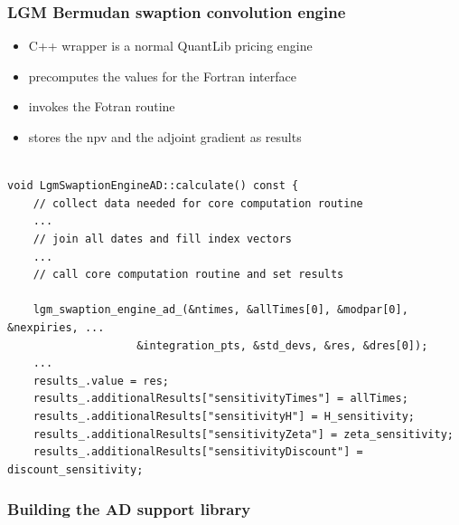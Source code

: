 \documentclass{beamer}
\begin{document}
\begin{frame}[fragile]
\frametitle{LGM Bermudan swaption convolution engine}
\begin{itemize}
\item C++ wrapper is a normal QuantLib pricing engine
\item precomputes the values for the Fortran interface
\item invokes the Fotran routine
\item stores the npv and the adjoint gradient as results
\end{itemize}
\begin{verbatim}

void LgmSwaptionEngineAD::calculate() const {
    // collect data needed for core computation routine
    ...
    // join all dates and fill index vectors
    ...
    // call core computation routine and set results

    lgm_swaption_engine_ad_(&ntimes, &allTimes[0], &modpar[0], &nexpiries, ...
                    &integration_pts, &std_devs, &res, &dres[0]);
    ...
    results_.value = res;
    results_.additionalResults["sensitivityTimes"] = allTimes;
    results_.additionalResults["sensitivityH"] = H_sensitivity;
    results_.additionalResults["sensitivityZeta"] = zeta_sensitivity;
    results_.additionalResults["sensitivityDiscount"] = discount_sensitivity;
\end{verbatim}
\end{frame}

\begin{frame}[fragile]
\frametitle{Building the AD support library}
\end{frame}
\end{document}
